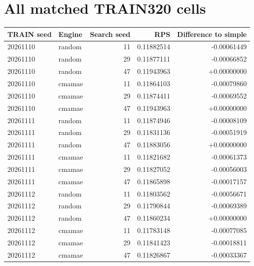 \documentclass[10pt]{article}
\begin{document}
\section{All matched TRAIN320 cells}
\begin{longtable}{llrrr}\toprule
TRAIN seed & Engine & Search seed & RPS & Difference to simple\\\midrule
20261110 & random & 11 & 0.11882514 & -0.00061449\\
20261110 & random & 29 & 0.11877111 & -0.00066852\\
20261110 & random & 47 & 0.11943963 & +0.00000000\\
20261110 & cmamae & 11 & 0.11864103 & -0.00079860\\
20261110 & cmamae & 29 & 0.11874411 & -0.00069552\\
20261110 & cmamae & 47 & 0.11943963 & +0.00000000\\
20261111 & random & 11 & 0.11874946 & -0.00008109\\
20261111 & random & 29 & 0.11831136 & -0.00051919\\
20261111 & random & 47 & 0.11883056 & +0.00000000\\
20261111 & cmamae & 11 & 0.11821682 & -0.00061373\\
20261111 & cmamae & 29 & 0.11827052 & -0.00056003\\
20261111 & cmamae & 47 & 0.11865898 & -0.00017157\\
20261112 & random & 11 & 0.11803562 & -0.00056671\\
20261112 & random & 29 & 0.11790844 & -0.00069389\\
20261112 & random & 47 & 0.11860234 & +0.00000000\\
20261112 & cmamae & 11 & 0.11783148 & -0.00077085\\
20261112 & cmamae & 29 & 0.11841423 & -0.00018811\\
20261112 & cmamae & 47 & 0.11826867 & -0.00033367\\
\bottomrule\end{longtable}
\end{document}
